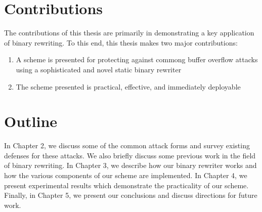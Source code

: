 \section{Contributions}

The contributions of this thesis are primarily in demonstrating a key application of binary
rewriting. To this end, this thesis makes two major contributions:

\begin{enumerate}

 \item A scheme is presented for protecting against commong buffer overflow attacks using a
 sophisticated and novel static binary rewriter

 \item The scheme presented is practical, effective, and immediately deployable

\end{enumerate}

\section{Outline}

In Chapter 2, we discuss some of the common attack forms and survey existing defenses for these
attacks. We also briefly discuss some previous work in the field of binary rewriting. In Chapter 3,
we describe how our binary rewriter works and how the various components of our scheme are
implemented. In Chapter 4, we present experimental results which demonstrate the practicality of our
scheme. Finally, in Chapter 5, we present our conclusions and discuss directions for future work.
